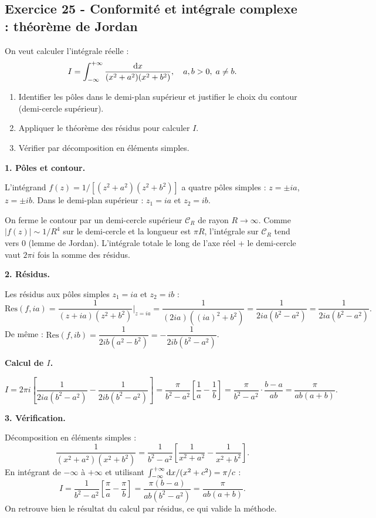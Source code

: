 \documentclass[12pt,a4paper]{article}
\begin{document}
\subsection*{Exercice 25 - Conformité et intégrale complexe : théorème de Jordan \niveau{\difficile}}

\begin{boiteexercice}
On veut calculer l'intégrale réelle :
\[
I = \int_{-\infty}^{+\infty} \frac{\mathrm{d} x}{(x^2+a^2)(x^2+b^2)}, \quad a, b > 0,\; a\neq b.
\]
\begin{enumerate}
  \item Identifier les pôles dans le demi-plan supérieur et justifier le choix du contour (demi-cercle supérieur).
  \item Appliquer le théorème des résidus pour calculer $I$.
  \item Vérifier par décomposition en éléments simples.
\end{enumerate}
\end{boiteexercice}

\begin{boitecorrige}

\textbf{1. Pôles et contour.}

L'intégrand $f(z) = 1/[(z^2+a^2)(z^2+b^2)]$ a quatre pôles simples : $z=\pm ia$, $z=\pm ib$. Dans le demi-plan supérieur : $z_1 = ia$ et $z_2 = ib$.

On ferme le contour par un demi-cercle supérieur $\mathcal{C}_R$ de rayon $R\to\infty$. Comme $|f(z)| \sim 1/R^4$ sur le demi-cercle et la longueur est $\pi R$, l'intégrale sur $\mathcal{C}_R$ tend vers 0 (lemme de Jordan). L'intégrale totale le long de l'axe réel + le demi-cercle vaut $2\pi i$ fois la somme des résidus.

\textbf{2. Résidus.}

Les résidus aux pôles simples $z_1 = ia$ et $z_2 = ib$ :
\[
\text{Res}(f, ia) = \frac{1}{(z+ia)(z^2+b^2)}\bigg|_{z=ia} = \frac{1}{(2ia)((ia)^2+b^2)} = \frac{1}{2ia(b^2-a^2)} = \frac{1}{2ia(b^2-a^2)}.
\]
De même : $\text{Res}(f, ib) = \dfrac{1}{2ib(a^2-b^2)} = -\dfrac{1}{2ib(b^2-a^2)}$.

\textbf{Calcul de $I$.}

\[
I = 2\pi i\!\left[\frac{1}{2ia(b^2-a^2)} - \frac{1}{2ib(b^2-a^2)}\right] = \frac{\pi}{b^2-a^2}\!\left[\frac{1}{a} - \frac{1}{b}\right] = \frac{\pi}{b^2-a^2}\cdot\frac{b-a}{ab} = \frac{\pi}{ab(a+b)}.
\]

\textbf{3. Vérification.}

Décomposition en éléments simples :
\[
\frac{1}{(x^2+a^2)(x^2+b^2)} = \frac{1}{b^2-a^2}\!\left[\frac{1}{x^2+a^2} - \frac{1}{x^2+b^2}\right].
\]
En intégrant de $-\infty$ à $+\infty$ et utilisant $\int_{-\infty}^{+\infty}\mathrm{d} x/(x^2+c^2) = \pi/c$ :
\[
I = \frac{1}{b^2-a^2}\!\left[\frac{\pi}{a} - \frac{\pi}{b}\right] = \frac{\pi(b-a)}{ab(b^2-a^2)} = \frac{\pi}{ab(a+b)}.
\]
On retrouve bien le résultat du calcul par résidus, ce qui valide la méthode.

\end{boitecorrige}

\ifdefined\inMainDoc\else
\end{document}
